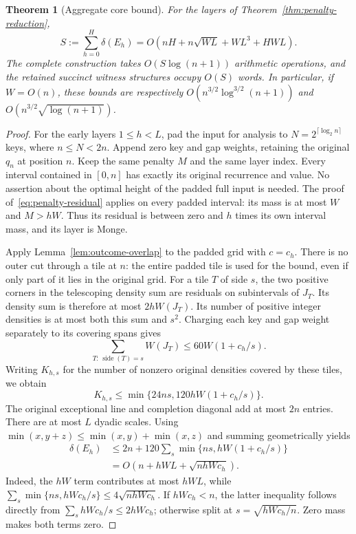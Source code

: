 \documentclass[11pt]{article}
\newtheorem{theorem}{Theorem}
\begin{document}
\begin{theorem}[Aggregate core bound]\label{thm:aggregate-cores}
For the layers of Theorem~\ref{thm:penalty-reduction},
\begin{equation}\label{eq:aggregate-cores}
 S:=\sum_{h=0}^H\delta(E_h)
 =O\!\left(nH+n\sqrt{WL}+WL^3+HWL\right).
\end{equation}
The complete construction takes $O(S\log(n+1))$ arithmetic operations,
and the retained succinct witness structures occupy $O(S)$ words.
In particular, if $W=O(n)$, these bounds are respectively
$O(n^{3/2}\log^{3/2}(n+1))$ and $O(n^{3/2}\sqrt{\log(n+1)})$.
\end{theorem}
\begin{proof}
For the early layers $1\le h<L$, pad the input for analysis to
$N=2^{\lceil\log_2 n\rceil}$ keys, where $n\le N<2n$. Append zero key
and gap weights, retaining the original $q_n$ at position $n$.
Keep the same penalty $M$ and the same layer index. Every interval
contained in $[0,n]$ has exactly its original recurrence and value.
No assertion about the optimal height of the padded full input is needed.
The proof of~\eqref{eq:penalty-residual} applies on every padded interval:
its mass is at most $W$ and $M>hW$. Thus its residual is between zero
and $h$ times its own interval mass, and its layer is Monge.

Apply Lemma~\ref{lem:outcome-overlap} to the padded grid with $c=c_h$.
There is no outer cut through a tile at $n$: the entire padded tile is
used for the bound, even if only part of it lies in the original grid.
For a tile $T$ of side $s$, the two positive corners in the telescoping
density sum are residuals on subintervals of $J_T$. Its density sum is
therefore at most $2hW(J_T)$. Its number of positive integer densities
is at most both this sum and $s^2$. Charging each key and gap weight
separately to its covering spans gives
\[
 \sum_{T:\,\operatorname{side}(T)=s} W(J_T)
 \le60W(1+c_h/s).
\]
Writing $K_{h,s}$ for the number of nonzero original densities covered
by these tiles, we obtain
\begin{equation}\label{eq:outcome-scale}
 K_{h,s}\le\min\{24ns,120hW(1+c_h/s)\}.
\end{equation}
The original exceptional line and completion diagonal add at most $2n$
entries. There are at most $L$ dyadic scales. Using
$\min(x,y+z)\le\min(x,y)+\min(x,z)$ and summing geometrically yields
\begin{align*}
 \delta(E_h)
 &\le 2n+120\sum_s\min\{ns,hW(1+c_h/s)\}\\
 &=O\!\left(n+hWL+\sqrt{nhWc_h}\right).
\end{align*}
Indeed, the $hW$ term contributes at most $hWL$, while
$\sum_s\min\{ns,hWc_h/s\}\le4\sqrt{nhWc_h}$.
If $hWc_h<n$, the latter inequality follows directly from
$\sum_s hWc_h/s\le2hWc_h$; otherwise split at
$s=\sqrt{hWc_h/n}$. Zero mass makes both terms zero.


\end{proof}
\end{document}
